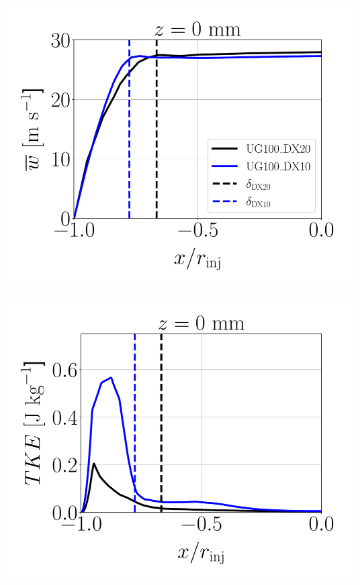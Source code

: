 \begin{figure}[ht]
\begin{subfigure}[b]{0.3\textwidth}
	\flushleft
   \includegraphics[scale=0.225]{./part2_developments/figures_ch5_resolved_JICF/instabilities_resolution/line_data_injector_uz_z0p00}
\end{subfigure}
\hfill
\begin{subfigure}[b]{0.3\textwidth}
	\flushleft
   \includegraphics[scale=0.225]{./part2_developments/figures_ch5_resolved_JICF/instabilities_resolution/line_data_injector_TKE_z0p00}
\end{subfigure}
\hfill
\begin{subfigure}[b]{0.3\textwidth}

\end{subfigure}
\end{figure}
